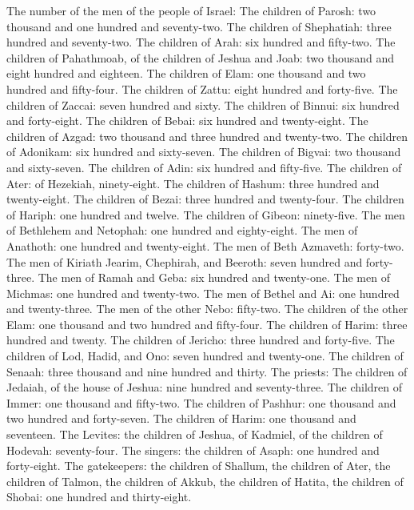 The number of the men of the people of Israel:  The children
of Parosh: two thousand and one hundred and seventy-two. 
The children of Shephatiah: three hundred and seventy-two. 
The children of Arah: six hundred and fifty-two.  The
children of Pahathmoab, of the children of Jeshua and Joab: two thousand
and eight hundred and eighteen.  The children of Elam: one
thousand and two hundred and fifty-four.  The children of
Zattu: eight hundred and forty-five.  The children of
Zaccai: seven hundred and sixty.  The children of Binnui:
six hundred and forty-eight.  The children of Bebai: six
hundred and twenty-eight.  The children of Azgad: two
thousand and three hundred and twenty-two.  The children of
Adonikam: six hundred and sixty-seven.  The children of
Bigvai: two thousand and sixty-seven.  The children of
Adin: six hundred and fifty-five.  The children of Ater: of
Hezekiah, ninety-eight.  The children of Hashum: three
hundred and twenty-eight.  The children of Bezai: three
hundred and twenty-four.  The children of Hariph: one
hundred and twelve.  The children of Gibeon: ninety-five.
 The men of Bethlehem and Netophah: one hundred and
eighty-eight.  The men of Anathoth: one hundred and
twenty-eight.  The men of Beth Azmaveth: forty-two.
 The men of Kiriath Jearim, Chephirah, and Beeroth: seven
hundred and forty-three.  The men of Ramah and Geba: six
hundred and twenty-one.  The men of Michmas: one hundred
and twenty-two.  The men of Bethel and Ai: one hundred and
twenty-three.  The men of the other Nebo: fifty-two.
 The children of the other Elam: one thousand and two
hundred and fifty-four.  The children of Harim: three
hundred and twenty.  The children of Jericho: three hundred
and forty-five.  The children of Lod, Hadid, and Ono: seven
hundred and twenty-one.  The children of Senaah: three
thousand and nine hundred and thirty.  The priests: The
children of Jedaiah, of the house of Jeshua: nine hundred and
seventy-three.  The children of Immer: one thousand and
fifty-two.  The children of Pashhur: one thousand and two
hundred and forty-seven.  The children of Harim: one
thousand and seventeen.  The Levites: the children of
Jeshua, of Kadmiel, of the children of Hodevah: seventy-four.
 The singers: the children of Asaph: one hundred and
forty-eight.  The gatekeepers: the children of Shallum, the
children of Ater, the children of Talmon, the children of Akkub, the
children of Hatita, the children of Shobai: one hundred and
thirty-eight.

